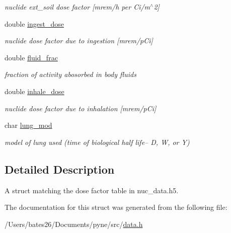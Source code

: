 \begin{DoxyCompactItemize}
\begin{DoxyCompactList}\small\item\em nuclide ext\+\_\+soil dose factor \mbox{[}mrem/h per Ci/m$^\wedge$2\mbox{]} \end{DoxyCompactList}\item 
\hypertarget{structpyne_1_1dose_a96dc0ff17888672afb40c82b3c6bb996}{double \hyperlink{structpyne_1_1dose_a96dc0ff17888672afb40c82b3c6bb996}{ingest\+\_\+dose}}\label{structpyne_1_1dose_a96dc0ff17888672afb40c82b3c6bb996}

\begin{DoxyCompactList}\small\item\em nuclide dose factor due to ingestion \mbox{[}mrem/p\+Ci\mbox{]} \end{DoxyCompactList}\item 
\hypertarget{structpyne_1_1dose_ac5aad706f373cee64e286f6191f753c2}{double \hyperlink{structpyne_1_1dose_ac5aad706f373cee64e286f6191f753c2}{fluid\+\_\+frac}}\label{structpyne_1_1dose_ac5aad706f373cee64e286f6191f753c2}

\begin{DoxyCompactList}\small\item\em fraction of activity abosorbed in body fluids \end{DoxyCompactList}\item 
\hypertarget{structpyne_1_1dose_ade66b3422bf24883142e0de856d67228}{double \hyperlink{structpyne_1_1dose_ade66b3422bf24883142e0de856d67228}{inhale\+\_\+dose}}\label{structpyne_1_1dose_ade66b3422bf24883142e0de856d67228}

\begin{DoxyCompactList}\small\item\em nuclide dose factor due to inhalation \mbox{[}mrem/p\+Ci\mbox{]} \end{DoxyCompactList}\item 
\hypertarget{structpyne_1_1dose_afc70c9461a6c1e3348a90e66747db41e}{char \hyperlink{structpyne_1_1dose_afc70c9461a6c1e3348a90e66747db41e}{lung\+\_\+mod}}\label{structpyne_1_1dose_afc70c9461a6c1e3348a90e66747db41e}

\begin{DoxyCompactList}\small\item\em model of lung used (time of biological half life-- D, W, or Y) \end{DoxyCompactList}\end{DoxyCompactItemize}


\subsection{Detailed Description}
A struct matching the dose factor table in nuc\+\_\+data.\+h5. 

The documentation for this struct was generated from the following file\+:\begin{DoxyCompactItemize}
\item 
/\+Users/bates26/\+Documents/pyne/src/\hyperlink{data_8h}{data.\+h}\end{DoxyCompactItemize}
